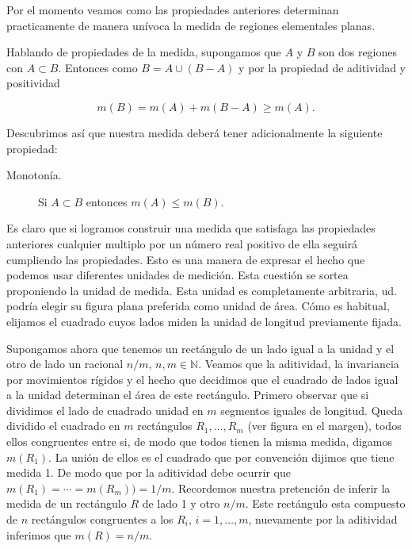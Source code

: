 Por el momento veamos como las propiedades anteriores determinan practicamente de manera unívoca la medida de regiones elementales planas.  


Hablando de propiedades de la medida, supongamos que $A$ y $B$ son dos regiones con $A\subset B$. Entonces como $B=A\cup (B-A)$ y por la propiedad de aditividad y positividad

\[
 m(B)=m(A)+m(B-A)\geq m(A).
\]

Descubrimos así que nuestra medida deberá tener adicionalmente la siguiente propiedad:
\begin{description}
 \item[Monotonía.] Si $A\subset B$ entonces $m(A)\leq m(B)$. 
\end{description}
Es claro que si logramos construir una medida que satisfaga las propiedades anteriores cualquier multiplo por un número real positivo  de ella seguirá cumpliendo las propiedades. Esto es una manera de expresar el hecho que podemos usar diferentes unidades de medición. Esta cuestión se sortea proponiendo la unidad de medida. Esta unidad es completamente arbitraria, ud. podría elegir su figura plana preferida como unidad de área.   Cómo es habitual, elijamos el cuadrado cuyos lados miden la unidad de longitud previamente fijada. 


Supongamos ahora que tenemos un rectángulo de un lado igual a la unidad y el otro de lado un racional $n/m$, $n,m\in\mathbb{N}$. Veamos que la aditividad, la invariancia por movimientos rígidos y el hecho que decidimos que el cuadrado de lados igual a la unidad determinan el área de este rectángulo. Primero observar que si dividimos el lado de cuadrado unidad en $m$ segmentos iguales de longitud. 
Queda dividido el cuadrado en $m$ rectángulos $R_1,\ldots,R_m$ (ver figura en el margen), todos ellos  congruentes entre si, de modo que todos tienen la misma medida, digamos $m(R_1)$. La unión de ellos es el cuadrado que por convención dijimos que tiene medida 1. De modo que por la aditividad debe ocurrir que $m(R_1)=\cdots =m(R_m))=1/m$. Recordemos nuestra pretención de inferir la medida de un rectángulo $R$ de lado 1 y otro $n/m$. Este rectángulo esta compuesto de $n$ rectángulos congruentes a los $R_i$, $i=1,\ldots,m$, nuevamente por la aditividad inferimos que $m(R)=n/m$. 

